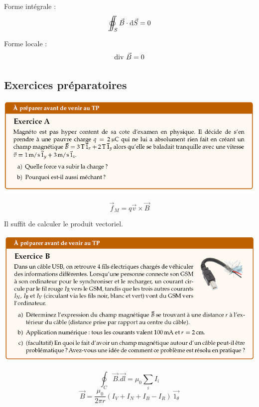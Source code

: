 \documentclass	[11pt, a4paper, openany]{book}
\begin{document}
		
		Forme intégrale : $$ \int\!\!\!\!\!\!\!\subset\!\!\!\supset\!\!\!\!\!\!\!\int_{S} \vec B \cdot {\rm d} \vec S = 0$$
		
		Forme locale : $$ \text{div}\,\,\vec B = 0$$
		
		
		
		
		
		
		\subsection{Exercices préparatoires}
		\begin{center}
			\includegraphics[scale=0.85]{prepa/magneto1.png}\\
		\end{center}
		$$\vec{f}_M = q\vec{v} \times \vec{B}$$
		\begin{center}
			Il suffit de calculer le produit vectoriel.
		\end{center}
		
		
		\begin{center}
			\includegraphics[scale=0.85]{prepa/magneto2.png}\\
		\end{center}
		
		$$\oint_C \vec{B}.\vec{dl} = \mu_0 \sum_i I_i$$
		$$\vec{B} = \frac{\mu_0}{2\pi r}\left(I_V + I_N + I_B - I_R\right)\ \vec{1_\theta}$$
		
\end{document}
